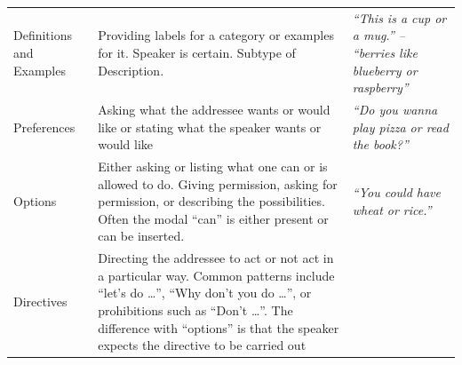 \documentclass[oneside]{report}
\theoremstyle{definition}
\theoremstyle{definition}
\theoremstyle{definition}
\theoremstyle{remark}
\begin{document}
\begin{longtable}[]{@{}lll@{}}
\begin{minipage}[t]{0.14\columnwidth}\raggedright\strut
Definitions and Examples\strut
\end{minipage} & \begin{minipage}[t]{0.44\columnwidth}\raggedright\strut
Providing labels for a category or examples for it. Speaker is certain.
Subtype of Description.\strut
\end{minipage} & \begin{minipage}[t]{0.33\columnwidth}\raggedright\strut
\emph{``This is a cup or a mug.'' -- ``berries like blueberry or
raspberry''}\strut
\end{minipage}\tabularnewline
\begin{minipage}[t]{0.14\columnwidth}\raggedright\strut
Preferences\strut
\end{minipage} & \begin{minipage}[t]{0.44\columnwidth}\raggedright\strut
Asking what the addressee wants or would like or stating what the
speaker wants or would like\strut
\end{minipage} & \begin{minipage}[t]{0.33\columnwidth}\raggedright\strut
\emph{``Do you wanna play pizza or read the book?''}\strut
\end{minipage}\tabularnewline
\begin{minipage}[t]{0.14\columnwidth}\raggedright\strut
Options\strut
\end{minipage} & \begin{minipage}[t]{0.44\columnwidth}\raggedright\strut
Either asking or listing what one can or is allowed to do. Giving
permission, asking for permission, or describing the possibilities.
Often the modal ``can'' is either present or can be inserted.\strut
\end{minipage} & \begin{minipage}[t]{0.33\columnwidth}\raggedright\strut
\emph{``You could have wheat or rice.''}\strut
\end{minipage}\tabularnewline
\begin{minipage}[t]{0.14\columnwidth}\raggedright\strut
Directives\strut
\end{minipage} & \begin{minipage}[t]{0.44\columnwidth}\raggedright\strut
Directing the addressee to act or not act in a particular way. Common
patterns include ``let's do \ldots{}'', ``Why don't you do \ldots{}'',
or prohibitions such as ``Don't \ldots{}''. The difference with
``options'' is that the speaker expects the directive to be carried out

\end{minipage}
\end{longtable}
\end{document}
